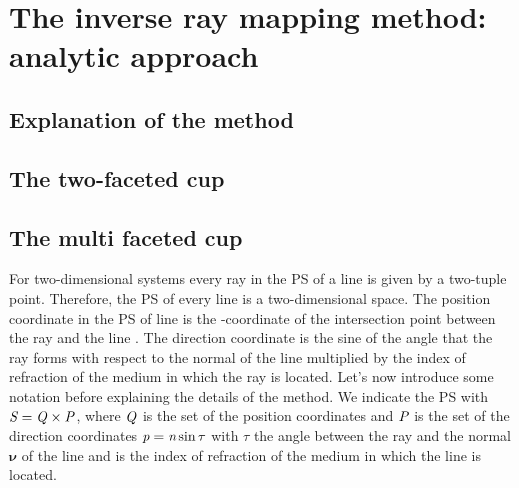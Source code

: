 
\chapter{The inverse ray mapping method: analytic approach}\label{chap:raymapping1}
\section{Explanation of the method}
\section{The two-faceted cup}
\section{The multi faceted cup}
For two-dimensional systems every ray in the PS of a line is given by a two-tuple point. Therefore, the PS of every line is a two-dimensional space.
The position coordinate in the PS of line  is the -coordinate of the intersection point between the ray and the line .
The direction coordinate is the sine of the angle that the ray forms with respect to the normal of the line  multiplied by the index of refraction of the medium in which the ray is located.
Let's now introduce some notation before explaining the details of the method. We indicate the PS with $\emph{S}_{\textit{}}=\emph{Q}_{\textit{}}\times\emph{P}_{\textit{}}$,
where $\emph{Q}_{\textit{}}$ is the set of the position coordinates  and $\emph{P}_{\textit{}}$ is the set of the direction coordinates $\textit{p}=\textit{n}\sin{\tau}$ with $\tau$ the angle between the ray and the normal \textit{$\boldsymbol{\nu}$} of the line and  is the index of refraction of the medium in which the line is located.  
